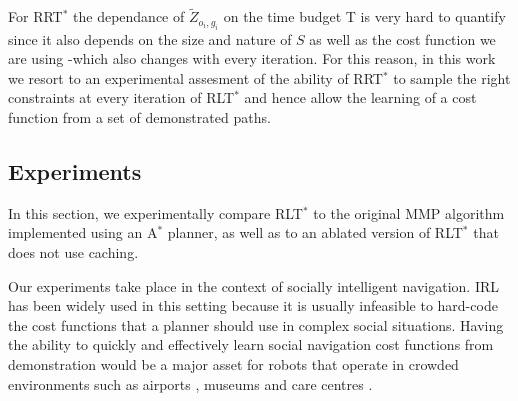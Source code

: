 \documentclass[a4paper,11pt]{report}
\begin{document}



For RRT$^*$ the dependance of $\tilde{Z}_{o_i,g_i}$ on the time budget T is very hard to quantify since it also depends on the size and nature of $S$ as well as the cost function we are using -which also changes with every iteration. For this reason, in this work we resort to an experimental assesment of the ability of RRT$^*$ to sample the right constraints at every iteration of RLT$^*$ and hence allow the learning of a cost function from a set of demonstrated paths.


\subsection{Experiments}
In this section, we experimentally compare RLT$^*$ to the original MMP algorithm implemented using an A$^*$ planner, as well as to an ablated version of RLT$^*$ that does not use caching.
	
	Our experiments take place in the context of socially intelligent navigation. IRL has been widely used in this setting \cite{okallearning,henry2010learning,vasquez2014inverse} because it is usually infeasible to hard-code the cost functions that a planner should use in complex social situations. Having the ability to quickly and effectively learn social navigation cost functions from demonstration would be a major asset for robots that operate in crowded environments such as airports \cite{triebel2015spencer}, museums \cite{thrun1999minerva} and care centres \cite{shiarlis2015teresa}.
	
\end{document}
